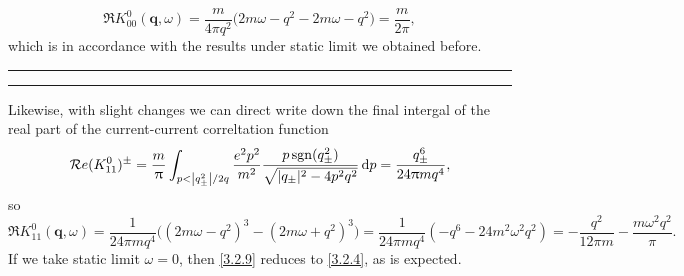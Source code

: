 \documentclass[bachelor,english,numbers]{ustcthesis}
\begin{document}
\begin{itemize}
				\begin{equation}\label{3.2.7}
					\Re K^0_{00}(\bm{q},\omega)=\dfrac{m}{4\pi q^2}\bigg(2m\omega-q^2-2m\omega-q^2\bigg)=\dfrac{m}{2\pi},
				\end{equation}
				which is in accordance with the results under static limit we obtained before.
				\vspace{1em}
				\hrule
				\vspace{2pt}
				\hrule
				\vspace{1em}
				Likewise, with slight changes we can direct write down the final intergal of the real part of the current-current correltation function
				\begin{equation}
					\mathop{\mathcal{R}e} (K^0_{11})^{\pm}=\dfrac{m}{\uppi}\int_{p<\left|q_{\pm}^2\right|/2q}\dfrac{e^2p^2}{m^2}\dfrac{p\mathop{\rm sgn}(q_{\pm}^2)}{\sqrt{|q_{\pm}|^2-4p^2q^2}}\mathop{}\!\mathrm{d} p=\dfrac{q_{\pm}^6}{24\uppi mq^4},\label{3.2.8}
				\end{equation}
				so
				\begin{equation}\label{3.2.9}
					\Re K^0_{11}(\bm{q},\omega)=\dfrac{1}{24\pi mq^4}\bigg((2m\omega-q^2)^3-(2m\omega+q^2)^3\bigg)=\dfrac{1}{24\pi mq^4}(-q^6-24m^2\omega^2 q^2)=-\dfrac{q^2}{12\pi m}-\dfrac{m\omega^2q^2}{\pi}.
				\end{equation}
				If we take static limit $\omega=0$, then \eqref{3.2.9} reduces to \eqref{3.2.4}, as is expected.
			

\end{itemize}
\end{document}
